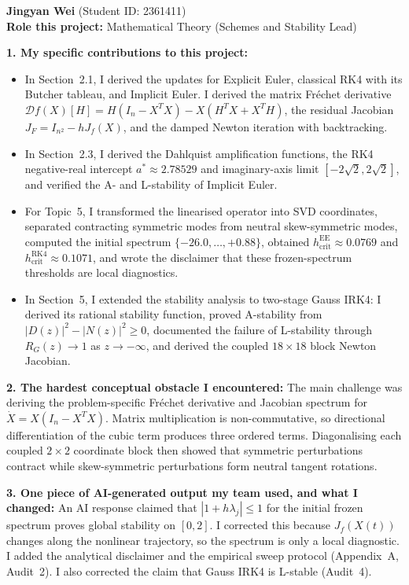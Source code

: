 \begin{formbox}
\footnotesize
\textbf{Jingyan Wei} (Student ID: 2361411)\\
\textbf{Role this project:} Mathematical Theory (Schemes and Stability Lead)

\textbf{1. My specific contributions to this project:}
\begin{itemize}[leftmargin=1.3em,itemsep=1pt,topsep=1pt]
    \item In Section~2.1, I derived the updates for Explicit Euler, classical
    RK4 with its Butcher tableau, and Implicit Euler. I derived the matrix
    Fr\'echet derivative
    $\mathcal{D}f(X)[H]=H(I_n-X^TX)-X(H^TX+X^TH)$, the residual Jacobian
    $J_F=I_{n^2}-hJ_f(X)$, and the damped Newton iteration with backtracking.
    \item In Section~2.3, I derived the Dahlquist amplification functions,
    the RK4 negative-real intercept $a^*\approx2.78529$ and imaginary-axis
    limit $[-2\sqrt2,2\sqrt2]$, and verified the A- and L-stability of
    Implicit Euler.
    \item For Topic~5, I transformed the linearised operator into SVD
    coordinates, separated contracting symmetric modes from neutral
    skew-symmetric modes, computed the initial spectrum
    $\{-26.0,\ldots,+0.88\}$, obtained
    $h_{\mathrm{crit}}^{\mathrm{EE}}\approx0.0769$ and
    $h_{\mathrm{crit}}^{\mathrm{RK4}}\approx0.1071$, and wrote the disclaimer
    that these frozen-spectrum thresholds are local diagnostics.
    \item In Section~5, I extended the stability analysis to two-stage Gauss
    IRK4: I derived its rational stability function, proved A-stability from
    $|D(z)|^2-|N(z)|^2\geq0$, documented the failure of L-stability through
    $R_G(z)\to1$ as $z\to-\infty$, and derived the coupled $18\times18$ block
    Newton Jacobian.
\end{itemize}

\textbf{2. The hardest conceptual obstacle I encountered:}
The main challenge was deriving the problem-specific Fr\'echet derivative and
Jacobian spectrum for $\dot X=X(I_n-X^TX)$. Matrix multiplication is
non-commutative, so directional differentiation of the cubic term produces
three ordered terms. Diagonalising each coupled $2\times2$ coordinate block
then showed that symmetric perturbations contract while skew-symmetric
perturbations form neutral tangent rotations.

\textbf{3. One piece of AI-generated output my team used, and what I changed:}
An AI response claimed that $|1+h\lambda_j|\leq1$ for the initial frozen
spectrum proves global stability on $[0,2]$. I corrected this because
$J_f(X(t))$ changes along the nonlinear trajectory, so the spectrum is only a
local diagnostic. I added the analytical disclaimer and the empirical sweep
protocol (Appendix~A, Audit~2). I also corrected the claim that Gauss IRK4 is
L-stable (Audit~4).


\end{formbox}
